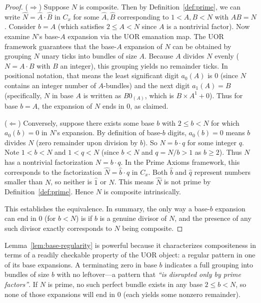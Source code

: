 \documentclass[11pt]{article}
\begin{document}
\begin{proof}
($\Rightarrow$) Suppose $N$ is composite. Then by Definition~\ref{def:prime}, we can write $\hat{N} = \hat{A}\cdot \hat{B}$ in $C_x$ for some $\hat{A},\hat{B}$ corresponding to $1 < A, B < N$ with $AB=N$. Consider $b = A$ (which satisfies $2 \le A < N$ since $A$ is a nontrivial factor). Now examine $N$’s base-$A$ expansion via the UOR emanation map. The UOR framework guarantees that the base-$A$ expansion of $N$ can be obtained by grouping $N$ unary ticks into bundles of size $A$. Because $A$ divides $N$ evenly ($N = A \cdot B$ with $B$ an integer), this grouping yields no remainder ticks. In positional notation, that means the least significant digit $a_0(A)$ is 0 (since $N$ contains an integer number of $A$-bundles) and the next digit $a_1(A) = B$ (specifically, $N$ in base $A$ is written as $B0_{(A)}$, which is $B \times A^1 + 0$). Thus for base $b=A$, the expansion of $N$ ends in 0, as claimed.

($\Leftarrow$) Conversely, suppose there exists some base $b$ with $2 \le b < N$ for which $a_0(b) = 0$ in $N$’s expansion. By definition of base-$b$ digits, $a_0(b)=0$ means $b$ divides $N$ (zero remainder upon division by $b$). So $N = b \cdot q$ for some integer $q$. Note $1 < b < N$ and $1 < q < N$ (since $b< N$ and $q = N/b > 1$ as $b\ge2$). Thus $N$ has a nontrivial factorization $N = b \cdot q$. In the Prime Axioms framework, this corresponds to the factorization $\hat{N} = \widehat{b}\cdot \hat{q}$ in $C_x$. Both $\widehat{b}$ and $\hat{q}$ represent numbers smaller than $N$, so neither is $\hat{1}$ or $\hat{N}$. This means $\hat{N}$ is not prime by Definition~\ref{def:prime}. Hence $N$ is composite intrinsically.

This establishes the equivalence. In summary, the only way a base-$b$ expansion can end in 0 (for $b < N$) is if $b$ is a genuine divisor of $N$, and the presence of any such divisor exactly corresponds to $N$ being composite.
\end{proof}

Lemma~\ref{lem:base-regularity} is powerful because it characterizes compositeness in terms of a readily checkable property of the UOR object: a regular pattern in one of its base expansions. A terminating zero in base $b$ indicates a full grouping into bundles of size $b$ with no leftover—a pattern that \emph{“is disrupted only by prime factors”}. If $N$ is prime, no such perfect bundle exists in any base $2 \le b < N$, so none of those expansions will end in 0 (each yields some nonzero remainder).
\end{document}
